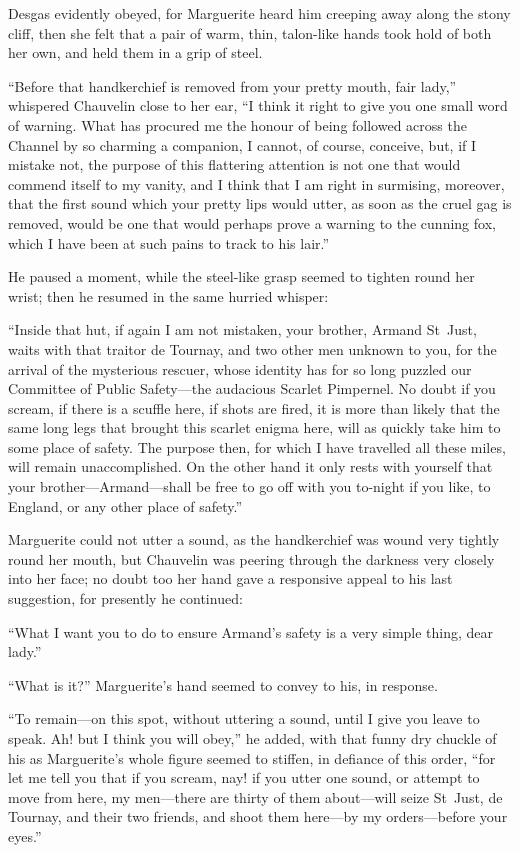 Desgas evidently obeyed, for Marguerite heard him creeping away along the stony cliff, then she felt that a pair of warm, thin, talon-like hands took hold of both her own, and held them in a grip of steel.

\enquote{Before that handkerchief is removed from your pretty mouth, fair lady,} whispered Chauvelin close to her ear, \enquote{I think it right to give you one small word of warning. What has procured me the honour of being followed across the Channel by so charming a companion, I cannot, of course, conceive, but, if I mistake not, the purpose of this flattering attention is not one that would commend itself to my vanity, and I think that I am right in surmising, moreover, that the first sound which your pretty lips would utter, as soon as the cruel gag is removed, would be one that would perhaps prove a warning to the cunning fox, which I have been at such pains to track to his lair.}

He paused a moment, while the steel-like grasp seemed to tighten round her wrist; then he resumed in the same hurried whisper:\longdash


\enquote{Inside that hut, if again I am not mistaken, your brother, Armand St~Just, waits with that traitor de Tournay, and two other men unknown to you, for the arrival of the mysterious rescuer, whose identity has for so long puzzled our Committee of Public Safety---the audacious Scarlet Pimpernel. No doubt if you scream, if there is a scuffle here, if shots are fired, it is more than likely that the same long legs that brought this scarlet enigma here, will as quickly take him to some place of safety. The purpose then, for which I have travelled all these miles, will remain unaccomplished. On the other hand it only rests with yourself that your brother---Armand---shall be free to go off with you to-night if you like, to England, or any other place of safety.}

Marguerite could not utter a sound, as the handkerchief was wound very tightly round her mouth, but Chauvelin was peering through the darkness very closely into her face; no doubt too her hand gave a responsive appeal to his last suggestion, for presently he continued:\longdash


\enquote{What I want you to do to ensure Armand's safety is a very simple thing, dear lady.}

\enquote{What is it?} Marguerite's hand seemed to convey to his, in response.

\enquote{To remain---on this spot, without uttering a sound, until I give you leave to speak. Ah! but I think you will obey,} he added, with that funny dry chuckle of his as Marguerite's whole figure seemed to stiffen, in defiance of this order, \enquote{for let me tell you that if you scream, nay! if you utter one sound, or attempt to move from here, my men---there are thirty of them about---will seize St~Just, de Tournay, and their two friends, and shoot them here---by my orders---before your eyes.}

